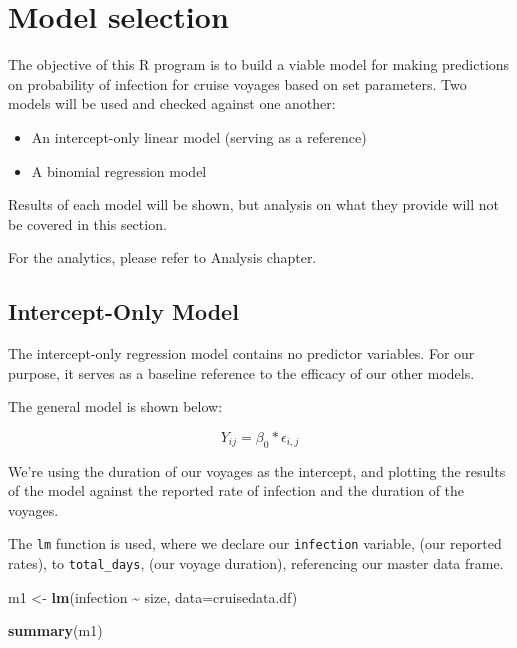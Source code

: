 \documentclass[
  11,
]{book}
\newenvironment{Shaded}{\begin{snugshade}}{\end{snugshade}}
\newcommand{\AttributeTok}[1]{\textcolor[rgb]{0.27,0.27,0.27}{#1}}
\newcommand{\FunctionTok}[1]{\textcolor[rgb]{0.27,0.27,0.27}{\textbf{#1}}}
\newcommand{\NormalTok}[1]{#1}
\newcommand{\OtherTok}[1]{\textcolor[rgb]{0.37,0.37,0.37}{#1}}
\newcommand{\SpecialCharTok}[1]{\textcolor[rgb]{0.43,0.43,0.43}{\textbf{#1}}}
\begin{document}
\hypertarget{model-selection}{%
\chapter*{Model selection}\label{model-selection}}


The objective of this R program is to build a viable model for making predictions on probability of infection for cruise voyages based on set parameters. Two models will be used and checked against one another:

\begin{itemize}
\item
  An intercept-only linear model (serving as a reference)
\item
  A binomial regression model
\end{itemize}

Results of each model will be shown, but analysis on what they provide will not be covered in this section.

For the analytics, please refer to Analysis chapter.

\hypertarget{intercept-only-model}{%
\section*{Intercept-Only Model}\label{intercept-only-model}}


The intercept-only regression model contains no predictor variables. For our purpose, it serves as a baseline reference to the efficacy of our other models.

The general model is shown below:

\begin{equation}
Y_{ij} = \beta_0*\epsilon_{i,j}
\end{equation}

We're using the duration of our voyages as the intercept, and plotting the results of the model against the reported rate of infection and the duration of the voyages.

The \texttt{lm} function is used, where we declare our \texttt{infection} variable, (our reported rates), to \texttt{total\_days}, (our voyage duration), referencing our master data frame.

\begin{Shaded}
\begin{Highlighting}[]
\NormalTok{m1 }\OtherTok{\textless{}{-}} \FunctionTok{lm}\NormalTok{(infection }\SpecialCharTok{\textasciitilde{}}\NormalTok{ size, }\AttributeTok{data=}\NormalTok{cruisedata.df)}

\FunctionTok{summary}\NormalTok{(m1)}
\end{Highlighting}
\end{Shaded}
\end{document}

